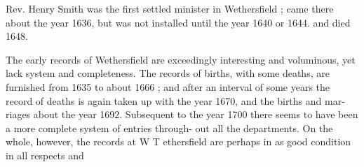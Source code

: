 \documentclass{book}
\begin{document}
Rev. Henry Smith was the first settled minister in Wethersfield ; 
came there about the year 1636, but was not installed until the 
year 1640 or 1644. and died 1648. 

The early records of Wethersfield are exceedingly interesting 
and voluminous, yet lack system and completeness. The records 
of births, with some deaths, are furnished from 1635 to about 
1666 ; and after an interval of some years the record of deaths 
is again taken up with the year 1670, and the births and mar- 
riages about the year 1692. Subsequent to the year 1700 there 
seems to have been a more complete system of entries through- 
out all the departments. On the whole, however, the records at 
W T ethersfield are perhaps in as good condition in all respects and 
\end{document}
